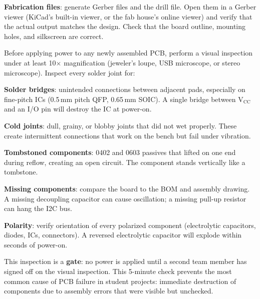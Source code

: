 \documentclass[11pt,letterpaper,twoside,openany]{book}
\begin{document}
\textbf{Fabrication files}: generate Gerber files and the drill file. Open them in a Gerber viewer (KiCad's built-in viewer, or the fab house's online viewer) and verify that the actual output matches the design. Check that the board outline, mounting holes, and silkscreen are correct.
\begin{keyconceptbox}
Before applying power to any newly assembled PCB, perform a visual inspection under at least 10$\times$ magnification (jeweler's loupe, USB microscope, or stereo microscope). Inspect every solder joint for:

\textbf{Solder bridges}: unintended connections between adjacent pads, especially on fine-pitch ICs (0.5\,mm pitch QFP, 0.65\,mm SOIC). A single bridge between V$_{\text{CC}}$ and an I/O pin will destroy the IC at power-on.

\textbf{Cold joints}: dull, grainy, or blobby joints that did not wet properly. These create intermittent connections that work on the bench but fail under vibration.

\textbf{Tombstoned components}: 0402 and 0603 passives that lifted on one end during reflow, creating an open circuit. The component stands vertically like a tombstone.

\textbf{Missing components}: compare the board to the BOM and assembly drawing. A missing decoupling capacitor can cause oscillation; a missing pull-up resistor can hang the I2C bus.

\textbf{Polarity}: verify orientation of every polarized component (electrolytic capacitors, diodes, ICs, connectors). A reversed electrolytic capacitor will explode within seconds of power-on.

This inspection is a \textbf{gate}: no power is applied until a second team member has signed off on the visual inspection. This 5-minute check prevents the most common cause of PCB failure in student projects: immediate destruction of components due to assembly errors that were visible but unchecked.
\end{keyconceptbox}
\end{document}
